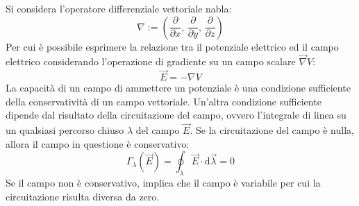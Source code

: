 \documentclass{article}
\newcommand{\df}{\mathrm{d}}
\numberwithin{equation}{subsection}
\begin{document}
Si considera l'operatore differenziale vettoriale nabla: 
\begin{equation*}
    {\nabla}:=\left(\displaystyle\frac{\partial}{\partial x},\,\frac{\partial}{\partial y},\,\frac{\partial}{\partial z}\right)
\end{equation*}
Per cui è possibile esprimere la relazione tra il potenziale elettrico ed il campo elettrico considerando l'operazione di gradiente su un campo scalare $\vec{\nabla}V$: 
\begin{equation}
    \vec{E}=-{\nabla}V
\end{equation}
La capacità di un campo di ammettere un potenziale è una condizione sufficiente della conservatività di un campo vettoriale. Un'altra condizione sufficiente dipende dal 
risultato della circuitazione del campo, ovvero l'integrale di linea su un qualsiasi percorso chiuso $\lambda$ del campo $\vec{E}$. Se la circuitazione del campo è nulla, 
allora il campo in questione è conservativo:
\begin{equation}
    \Gamma_\lambda(\vec{E})=\displaystyle\oint_{\lambda}\vec{E}\cdot \df\vec{\lambda}=0
\end{equation}
Se il campo non è conservativo, implica che il campo è variabile per cui la circuitazione risulta diversa da zero. 
\end{document}
